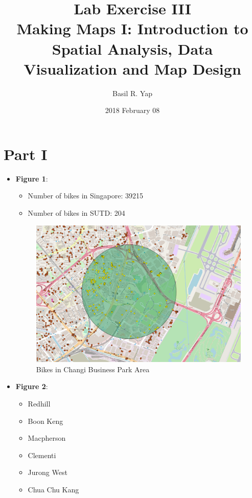 \documentclass[a4paper, fleqn]{article}
\begin{document}
\title{Lab Exercise III \\ Making Maps I: Introduction to Spatial Analysis, Data Visualization and Map Design}
\author{Basil R. Yap}
\date{2018 February 08}
\maketitle

\section{Part I}

\begin{itemize}
\item \textbf{Figure 1}: \begin{itemize}
\item Number of bikes in Singapore: 39215
\item Number of bikes in SUTD: 204
\end{itemize}
\begin{figure}[h!]
\includegraphics[width=\linewidth]{./assets/201802081725.png}
\caption{Bikes in Changi Business Park Area}
\label{figure:map1}
\end{figure}
\pagebreak
\item \textbf{Figure 2}: \begin{itemize}
\item Redhill
\item Boon Keng
\item Macpherson
\item Clementi
\item Jurong West
\item Chua Chu Kang
\end{itemize}

\end{itemize}
\end{document}
